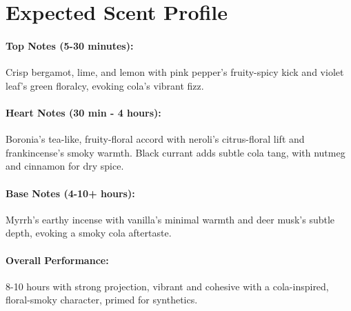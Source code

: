 \documentclass{article}
\begin{document}
\section*{Expected Scent Profile}

\paragraph{\textcolor{colaRed}{\textbf{Top Notes (5-30 minutes):}}}
Crisp bergamot, lime, and lemon with pink pepper’s fruity-spicy kick and violet leaf’s green floralcy, evoking cola’s vibrant fizz.

\paragraph{\textcolor{colaBrown}{\textbf{Heart Notes (30 min - 4 hours):}}}
Boronia’s tea-like, fruity-floral accord with neroli’s citrus-floral lift and frankincense’s smoky warmth. Black currant adds subtle cola tang, with nutmeg and cinnamon for dry spice.

\paragraph{\textcolor{colaDark}{\textbf{Base Notes (4-10+ hours):}}}
Myrrh’s earthy incense with vanilla’s minimal warmth and deer musk’s subtle depth, evoking a smoky cola aftertaste.

\paragraph{\textcolor{violetPurple}{\textbf{Overall Performance:}}}
8-10 hours with strong projection, vibrant and cohesive with a cola-inspired, floral-smoky character, primed for synthetics.
\end{document}
